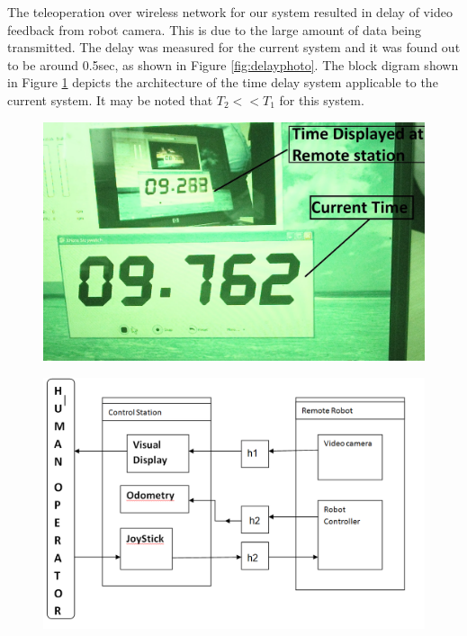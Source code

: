 \documentclass[12pt,a4paper, notitlepage]{article}
\begin{document}
 
The teleoperation  over wireless network for our system   resulted in delay of video feedback from robot camera. This is due to the large amount of data being transmitted. The delay was measured for the current system and it was found out to be around  
0.5sec, as shown in Figure \ref{fig:delayphoto}. The block digram shown in Figure \ref{fig:blockdigTimeDelay} depicts the architecture of the time delay system applicable to the current system. It may be noted that $T_2<<T_1$ for this system.
 \begin{figure}[ht]
 	\centering
 	\begin{minipage}{0.45\textwidth}
 		\centering
 		\includegraphics[width=\linewidth,keepaspectratio]{fig/delayMeasureNew}
 		\label{fig:delayphoto}
 	\end{minipage}%
 	\begin{minipage}{0.55\textwidth}
 		\centering
 		\includegraphics[width=.9\linewidth,keepaspectratio]{fig/BlockTimeDelay}
 		\label{fig:blockdigTimeDelay}
 	\end{minipage}
 \end{figure}
\end{document}
